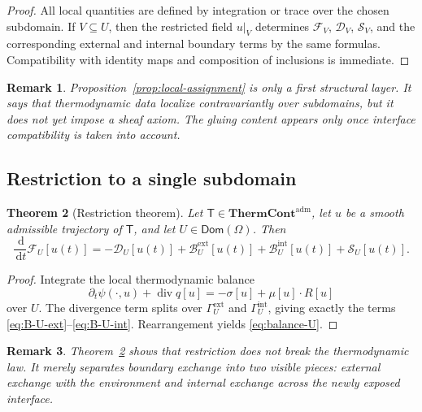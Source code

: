 \documentclass[11pt]{article}
\newtheorem{theorem}{Theorem}[section]
\newtheorem{remark}[theorem]{Remark}
\newcommand{\Om}{\Omega}
\newcommand{\diver}{\operatorname{div}}
\newcommand{\dd}{\,\mathrm{d}}
\newcommand{\F}{\mathcal{F}}
\newcommand{\Diss}{\mathcal{D}}
\newcommand{\Bnd}{\mathcal{B}}
\newcommand{\Src}{\mathcal{S}}
\newcommand{\ThermAdm}{\mathbf{ThermCont}^{\mathrm{adm}}}
\begin{document}
\begin{proof}
All local quantities are defined by integration or trace over the chosen subdomain.
If \(V\subseteq U\), then the restricted field \(u|_V\) determines \(\F_V\),
\(\Diss_V\), \(\Src_V\), and the corresponding external and internal boundary terms
by the same formulas. Compatibility with identity maps and composition of inclusions
is immediate.
\end{proof}

\begin{remark}
Proposition~\ref{prop:local-assignment} is only a first structural layer. It says
that thermodynamic data localize contravariantly over subdomains, but it does not
yet impose a sheaf axiom. The gluing content appears only once interface
compatibility is taken into account.
\end{remark}

\subsection{Restriction to a single subdomain}

\begin{theorem}[Restriction theorem]\label{thm:restriction}
Let \(\mathsf{T}\in\ThermAdm\), let \(u\) be a smooth admissible trajectory of
\(\mathsf{T}\), and let \(U\in\mathsf{Dom}(\Om)\). Then
\begin{equation}\label{eq:balance-U}
\frac{\dd}{\dd t}\F_U[u(t)]
=
-\Diss_U[u(t)]
+\Bnd_U^{\mathrm{ext}}[u(t)]
+\Bnd_U^{\mathrm{int}}[u(t)]
+\Src_U[u(t)].
\end{equation}
\end{theorem}

\begin{proof}
Integrate the local thermodynamic balance
\[
\partial_t \psi(\cdot,u) + \diver q[u]
=
-\sigma[u] + \mu[u]\cdot R[u]
\]
over \(U\). The divergence term splits over \(\Gamma_U^{\mathrm{ext}}\) and
\(\Gamma_U^{\mathrm{int}}\), giving exactly the terms
\eqref{eq:B-U-ext}--\eqref{eq:B-U-int}. Rearrangement yields
\eqref{eq:balance-U}.
\end{proof}

\begin{remark}
Theorem~\ref{thm:restriction} shows that restriction does not break the
thermodynamic law. It merely separates boundary exchange into two visible pieces:
external exchange with the environment and internal exchange across the newly exposed
interface.
\end{remark}
\end{document}
